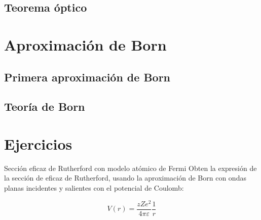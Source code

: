 \subsection{Teorema óptico}

\section{Aproximación de Born}

\subsection{Primera aproximación de Born}

\subsection{Teoría de Born}

\section*{Ejercicios}


\begin{Ejercicio}{Sección eficaz de Rutherford con modelo atómico de Fermi} \label{Ej:01.01}
    Obten la expresión de la sección de eficaz de Rutherford, usando la aproximación de Born con ondas planas incidentes y salientes con el potencial de Coulomb:

    \begin{equation}
        V(r) = \frac{zZe^2}{4\pi \varepsilon} \frac{1}{r}
    \end{equation}
\end{Ejercicio}


